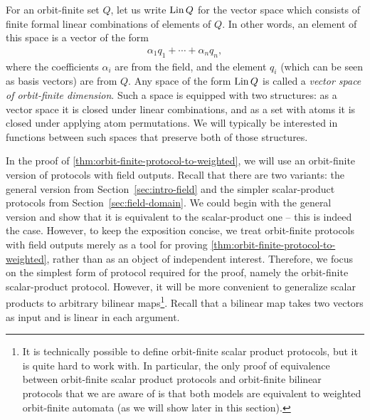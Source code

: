 For an orbit-finite set $Q$, let us write $\operatorname{Lin} Q$ for the vector space which consists of finite formal linear combinations of elements of $Q$. In other words, an element of this space is a vector of the form 
\begin{align*}
\alpha_1 q_1 + \cdots + \alpha_n q_n,
\end{align*}
where the coefficients $\alpha_i$ are from the field, and the element $q_i$ (which can be seen as basis vectors) are from $Q$. Any space of the form $\operatorname{Lin} Q$ is called a \emph{vector space of orbit-finite dimension}. Such a space is equipped with two structures: as a vector space it is closed under linear combinations, and as a set with atoms it is closed under applying atom permutations.
We will typically be interested in functions between such spaces that preserve both of those structures.

In the proof of \cref{thm:orbit-finite-protocol-to-weighted}, we will use an orbit-finite version of protocols with field outputs. 
Recall that there are two variants: the general version from Section~\ref{sec:intro-field} and the simpler scalar-product protocols 
from Section~\ref{sec:field-domain}. We could begin with the general version and show that it is equivalent to the scalar-product one --
this is indeed the case. However, to keep the exposition concise, we treat orbit-finite protocols with field outputs merely as a tool 
for proving \cref{thm:orbit-finite-protocol-to-weighted}, rather than as an object of independent interest. Therefore, we focus on the 
simplest form of protocol required for the proof, namely the orbit-finite scalar-product protocol. However, it will be more 
convenient to generalize scalar products to arbitrary bilinear maps\footnote{
    It is technically possible to define orbit-finite scalar product protocols,
    but it is quite hard to work with. In particular, the only proof of equivalence
    between orbit-finite scalar product protocols and orbit-finite bilinear protocols
    that we are aware of is that both models are equivalent to weighted orbit-finite automata
    (as we will show later in this section).
}. Recall that a bilinear map takes two vectors as input and is linear in each argument.


